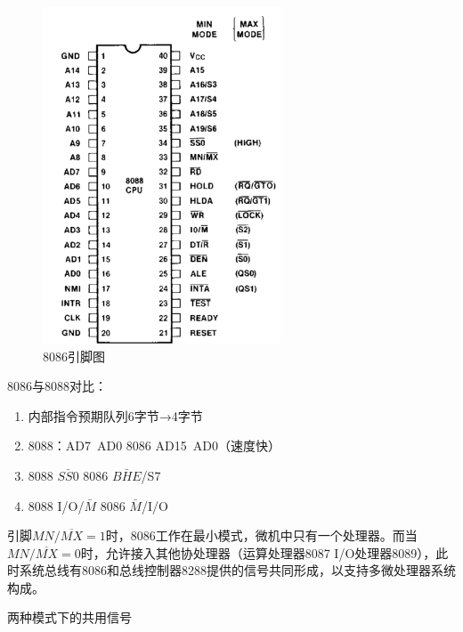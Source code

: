 \documentclass{article}
\begin{document}
\begin{figure}[H]
    \centering
    \includegraphics[height=10cm]{img/2.1-9.png}
    \caption{8086引脚图}
\end{figure}

8086与8088对比：
\begin{enumerate}
    \item 内部指令预期队列6字节→4字节
    \item 8088：AD7~AD0 8086 AD15~AD0（速度快）
    \item 8088 $\bar{SS0}$ 8086 $\bar{BHE}$/S7
    \item 8088 I/O/$\bar{M}$ 8086 $\bar{M}$/I/O
\end{enumerate}

引脚$MN/\overline{MX}=1$时，8086工作在最小模式，微机中只有一个处理器。而当$MN/\overline{MX}=0$时，允许接入其他协处理器（运算处理器8087 I/O处理器8089），此时系统总线有8086和总线控制器8288提供的信号共同形成，以支持多微处理器系统构成。

两种模式下的共用信号
\end{document}

